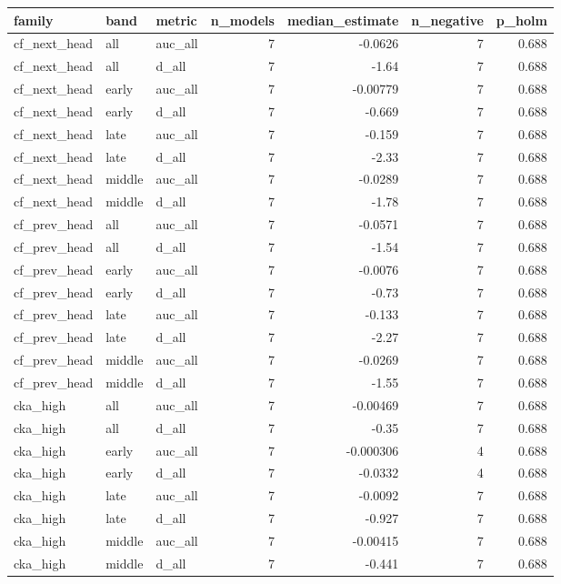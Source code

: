 \begin{table}[t]
\centering
\small
\begin{tabular}{lllrrrr}
\toprule
family & band & metric & n\_models & median\_estimate & n\_negative & p\_holm \\
\midrule
cf\_next\_head & all & auc\_all & 7 & -0.0626 & 7 & 0.688 \\
cf\_next\_head & all & d\_all & 7 & -1.64 & 7 & 0.688 \\
cf\_next\_head & early & auc\_all & 7 & -0.00779 & 7 & 0.688 \\
cf\_next\_head & early & d\_all & 7 & -0.669 & 7 & 0.688 \\
cf\_next\_head & late & auc\_all & 7 & -0.159 & 7 & 0.688 \\
cf\_next\_head & late & d\_all & 7 & -2.33 & 7 & 0.688 \\
cf\_next\_head & middle & auc\_all & 7 & -0.0289 & 7 & 0.688 \\
cf\_next\_head & middle & d\_all & 7 & -1.78 & 7 & 0.688 \\
cf\_prev\_head & all & auc\_all & 7 & -0.0571 & 7 & 0.688 \\
cf\_prev\_head & all & d\_all & 7 & -1.54 & 7 & 0.688 \\
cf\_prev\_head & early & auc\_all & 7 & -0.0076 & 7 & 0.688 \\
cf\_prev\_head & early & d\_all & 7 & -0.73 & 7 & 0.688 \\
cf\_prev\_head & late & auc\_all & 7 & -0.133 & 7 & 0.688 \\
cf\_prev\_head & late & d\_all & 7 & -2.27 & 7 & 0.688 \\
cf\_prev\_head & middle & auc\_all & 7 & -0.0269 & 7 & 0.688 \\
cf\_prev\_head & middle & d\_all & 7 & -1.55 & 7 & 0.688 \\
cka\_high & all & auc\_all & 7 & -0.00469 & 7 & 0.688 \\
cka\_high & all & d\_all & 7 & -0.35 & 7 & 0.688 \\
cka\_high & early & auc\_all & 7 & -0.000306 & 4 & 0.688 \\
cka\_high & early & d\_all & 7 & -0.0332 & 4 & 0.688 \\
cka\_high & late & auc\_all & 7 & -0.0092 & 7 & 0.688 \\
cka\_high & late & d\_all & 7 & -0.927 & 7 & 0.688 \\
cka\_high & middle & auc\_all & 7 & -0.00415 & 7 & 0.688 \\
cka\_high & middle & d\_all & 7 & -0.441 & 7 & 0.688 \\

\end{tabular}
\end{table}
